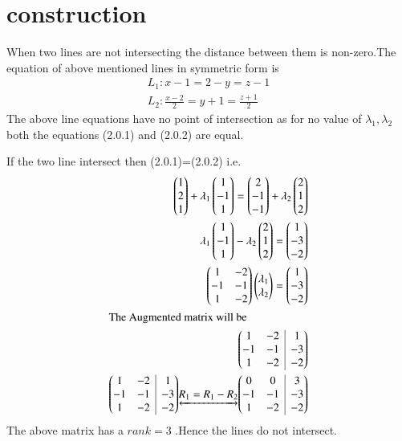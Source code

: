 \documentclass[journal,12pt,twocolumn]{IEEEtran}
\makeatletter
\newenvironment{amatrix}[1]{%
  \left(\begin{array}{@{}*{#1}{c}|c@{}}
}{%
  \end{array}\right)
}
\newcommand{\myvec}[1]{\ensuremath{\begin{pmatrix}#1\end{pmatrix}}}
\numberwithin{equation}{subsection}
\makeatother
\begin{document}
\section{construction}
When two lines are not intersecting the distance between them is non-zero.The equation of above mentioned lines in symmetric form is
\begin{align}
    L_1\colon x-1=2-y=z-1\\
    L_2\colon \frac{x-2}{2}=y+1=\frac{z+1}{2}
\end{align}
The above line equations have no point of intersection as for no value of $\lambda_1,\lambda_2$ both the equations (2.0.1) and (2.0.2) are equal.\par
If the two line intersect then (2.0.1)=(2.0.2) i.e.
\begin{align}
    \myvec{1\\2\\1}+\lambda_1\myvec{1\\-1\\1}=\myvec{2\\-1\\-1}+\lambda_2\myvec{2\\1\\2}\\
    \lambda_1\myvec{1\\-1\\1}-\lambda_2\myvec{2\\1\\2}=\myvec{1\\-3\\-2}\\
    \myvec{1 & -2\\-1 & -1\\1 & -2}\myvec{\lambda_1\\\lambda_2}=\myvec{1\\-3\\-2}\\
    \intertext{The Augmented matrix will be}
    \begin{amatrix}{2}1 & -2 & 1\\-1 & -1 & -3\\1 & -2 & -2\end{amatrix}\\
    \begin{amatrix}{2}1 & -2 & 1\\-1 & -1 & -3\\1 & -2 & -2\end{amatrix}\underleftrightarrow{R_1=R_1-R_2}\begin{amatrix}{2}0 & 0 & 3\\-1 & -1 & -3\\1 & -2 & -2\end{amatrix}
\end{align}
The above matrix has a $rank=3$ .Hence the lines do not intersect.
\end{document}
